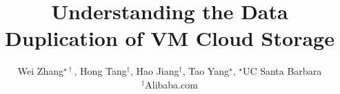 \documentclass[finalversion]{usetex-v1}
\begin{document}
\title{Understanding the Data Duplication of VM Cloud Storage}
\author{
Wei Zhang$^{\star\dagger}$, Hong Tang$^\dagger$, Hao Jiang$^\dagger$, Tao Yang$^\star$, 
   {\normalsize $^\star$UC Santa Barbara}\\
   {\normalsize$^\dagger$Alibaba.com}
}
\date{}
\maketitle

%

%
%
%
%



{\small


}
\end{document}
